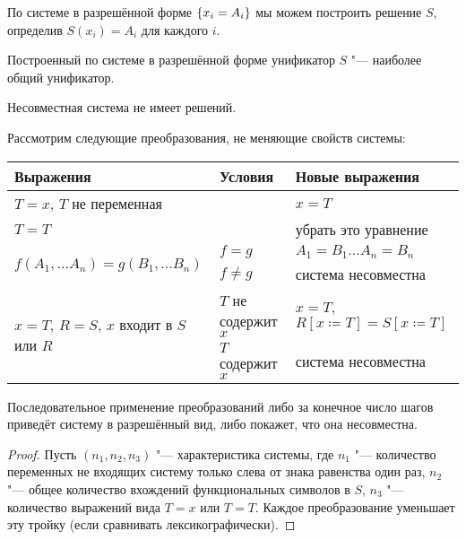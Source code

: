 По системе в разрешённой форме $\left\{x_i = A_i\right\}$ мы можем построить решение $S$, определив $S(x_i) = A_i$ для каждого $i$.

\begin{statement}
    Построенный по системе в разрешённой форме унификатор $S$ "--- наиболее общий унификатор.
\end{statement}

\begin{statement}
    Несовместная система не имеет решений.
\end{statement}

Рассмотрим следующие преобразования, не меняющие свойств системы:
\begin{center}
\begin{tabular}{l l l} \toprule
    Выражения                         & Условия             & Новые выражения \\ \midrule
    $T=x$, $T$ не переменная          &                     & $x=T$ \\ \midrule
    $T=T$                             &                     & убрать это уравнение \\ \midrule
    \multirow{2}{*}[-\aboverulesep]{$f(A_1, \ldots A_n) = g(B_1, \ldots B_n)$}
                                      & $f=g$               & $ A_1 = B_1 \ldots A_n = B_n$ \\ \cmidrule{2-3}
                                      & $f \neq g$          & система несовместна \\ \midrule
    \multirow{2}{*}[-\aboverulesep]{$x=T$, $R=S$, $x$ входит в $S$ или $R$}
                                      & $T$ не содержит $x$ & $x=T$,
                                        $R\left[x\coloneqq T\right]=S\left[x\coloneqq T\right]$\\ \cmidrule{2-3}
                                      & $T$ содержит $x$    & система несовместна \\ \bottomrule
\end{tabular}
\end{center}

\begin{statement}
    Последовательное применение преобразований либо за конечное число шагов приведёт систему в разрешённый вид,
    либо покажет, что она несовместна.
\end{statement}

\begin{proof}
    Пусть $(n_1, n_2, n_3)$ "--- характеристика системы, где
    $n_1$ "--- количество переменных не входящих систему только слева от знака равенства один раз,
    $n_2$ "--- общее количество вхождений функциональных символов в $S$,
    $n_3$ "--- количество выражений вида $T=x$ или $T=T$.
    Каждое преобразование уменьшает эту тройку (если сравнивать лексикографически).
\end{proof}

